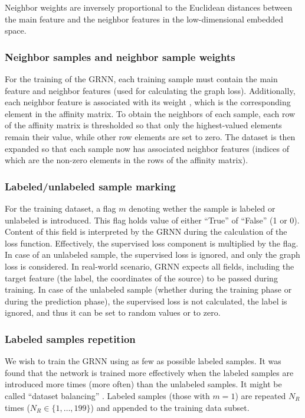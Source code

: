 \documentclass[applsci,article,submit,moreauthors,pdftex]{Definitions/mdpi}
\begin{document}
Neighbor weights are inversely proportional to the Euclidean distances between the main feature and the neighbor features in the low-dimensional embedded space.

\subsubsection{Neighbor samples and neighbor sample weights}
For the training of the GRNN, each training sample must contain the main \srpphat{} feature and \gnbrs{} neighbor \srpphat{} features (used for calculating the graph loss). Additionally, each neighbor feature is associated with its weight \nbrweigth{}, which is the corresponding element in the affinity matrix.
To obtain the \gnbrs{} neighbors of each sample, each row of the affinity matrix is thresholded so that only the \gnbrs{} highest-valued elements remain their value, while other row elements are set to zero.
The dataset is then expanded so that each sample now has associated neighbor \srpphat{} features (indices of which are the non-zero elements in the rows of the affinity matrix). 


\subsubsection{Labeled/unlabeled sample marking}
For the training dataset, a flag $ m $ denoting wether the sample is labeled or unlabeled is introduced. This flag holds value of either ``True'' of ``False'' (1 or 0). Content of this field is interpreted by the GRNN during the calculation of the loss function. Effectively, the supervised loss component is multiplied by the flag. In case of an unlabeled sample, the supervised loss is ignored, and only the graph loss is considered. In real-world scenario, GRNN expects all fields, including the target feature (the label, the coordinates of the source) to be passed during training. In case of the unlabeled sample (whether during the training phase or during the prediction phase), the supervised loss is not calculated, the label is ignored, and thus it can be set to random values or to zero. 

\subsubsection{Labeled samples repetition}
We wish to train the GRNN using as few as possible labeled samples. It was found that the network is trained more effectively when the labeled samples are introduced more times (more often) than the unlabeled samples. It might be called ``dataset balancing'' \cite{}. 
Labeled samples (those with $ m =  1 $) are repeated $ N_R $ times ($ N_R \in \{1,\dots,199\}$) and appended to the training data subset.
\end{document}
